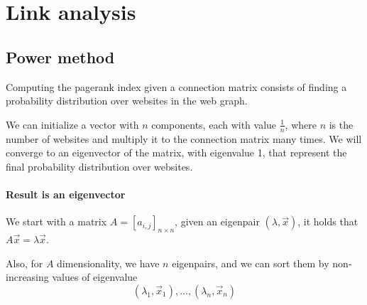 \section{Link analysis}

\subsection{Power method}
Computing the pagerank index given a connection matrix 
consists of finding 
a probability distribution over websites in the web graph.

We can initialize a vector with $n$ components, each 
with value $\frac{1}{n}$, where $n$ is the number of websites 
and multiply it to the connection matrix many times. 
We will converge to an eigenvector of the matrix, with eigenvalue 1, 
that represent the final probability distribution over websites.

\paragraph{Result is an eigenvector}
We start with a matrix $A = [a_{i,j}]_{n \times n}$, given an eigenpair $(\lambda, \vec{x})$, it holds that $A\vec{x} = \lambda \vec{x}$.

Also, for $A$ dimensionality, we have $n$ eigenpairs, and we can 
sort them by non-increasing values of eigenvalue
$$(\lambda_1, \vec{x}_1), \dots, (\lambda_n, \vec{x}_n)$$

